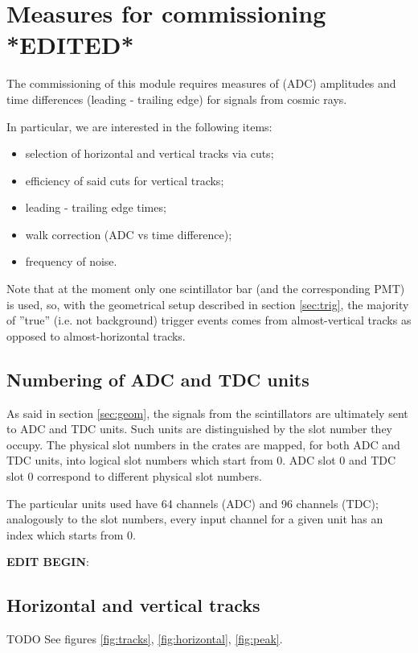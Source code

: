 \documentclass{article}
\begin{document}
\section{Measures for commissioning *EDITED*}\label{sec:meas}

The commissioning of this module requires measures of (ADC) amplitudes and time differences (leading - trailing edge) for signals from cosmic rays.

In particular, we are interested in the following items:
\begin{itemize}
\item selection of horizontal and vertical tracks via cuts;
\item efficiency of said cuts for vertical tracks;
\item leading - trailing edge times;
\item walk correction (ADC vs time difference);
\item frequency of noise.
\end{itemize}

Note that at the moment only one scintillator bar (and the corresponding PMT) is used, so, with the geometrical setup described in section \ref{sec:trig}, the majority of ''true'' (i.e. not background) trigger events comes from almost-vertical tracks as opposed to almost-horizontal tracks.

\subsection{Numbering of ADC and TDC units}
As said in section \ref{sec:geom}, the signals from the scintillators are ultimately sent to ADC and TDC units.
Such units are distinguished by the slot number they occupy.
The physical slot numbers in the crates are mapped, for both ADC and TDC units, into logical slot numbers which start from 0. ADC slot 0 and TDC slot 0 correspond to different physical slot numbers.

The particular units used have 64 channels (ADC) and 96 channels (TDC); analogously to the slot numbers, every input channel for a given unit has an index which starts from 0.

\textbf{EDIT BEGIN}:

\subsection{Horizontal and vertical tracks}\label{sec:tracks}
TODO
See figures \ref{fig:tracks}, \ref{fig:horizontal}, \ref{fig:peak}.
\end{document}
